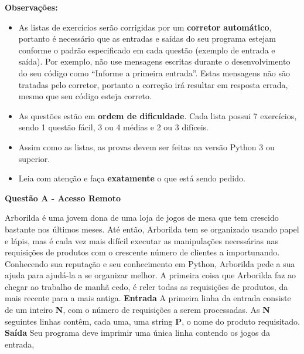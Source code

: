 \documentclass[a4paper, 12pt]{article}
\begin{document}
\textbf{{\large Observações:}}
\begin{itemize}
	\item As listas de exercícios serão corrigidas por um \textbf{corretor automático}, portanto é necessário que as entradas e saídas do seu programa estejam conforme o padrão especificado em cada questão (exemplo de entrada e saída). Por exemplo, não use mensagens escritas durante o desenvolvimento do seu código como ``Informe a primeira entrada''. Estas mensagens não são tratadas pelo corretor, portanto a correção irá resultar em resposta errada, mesmo que seu código esteja correto.
	\item As questões estão em \textbf{ordem de dificuldade}. Cada lista possui 7 exercícios, sendo 1 questão fácil, 3 ou 4 médias e 2 ou 3 difíceis.
	\item Assim como as listas, as provas devem ser feitas na versão Python 3 ou superior.
	\item Leia com atenção e faça \textbf{exatamente} o que está sendo pedido.
\end{itemize}
\newpage %
\begin{center}
\textbf{{\Large Questão A - Acesso Remoto}}
\end{center}
\vspace{5pt}
Arborilda é uma jovem dona de uma loja de jogos de mesa que tem crescido
bastante nos últimos meses. Até então, Arborilda tem se organizado usando
papel e lápis, mas é cada vez mais difícil executar as manipulações
necessárias nas requisições de produtos com o crescente número de clientes
a importunando. \newline \newline
Conhecendo sua reputação e seu conhecimento em Python, Arborilda pede a
sua ajuda para ajudá-la a se organizar melhor. A primeira coisa que Arborilda faz ao chegar ao trabalho de manhã cedo, é reler todas as requisições de produtos, da mais recente para a mais antiga.
\newline \newline
\textbf{{\large Entrada}} \newline
A primeira linha da entrada consiste de um inteiro \textbf{N}, com o número de
requisições a serem processadas. As \textbf{N} seguintes linhas contêm, cada uma,
uma string \textbf{P}, o nome do produto requisitado.
\newline \newline
\textbf{{\large Saída}} \newline
Seu programa deve imprimir uma única linha contendo os jogos da entrada,
\end{document}
